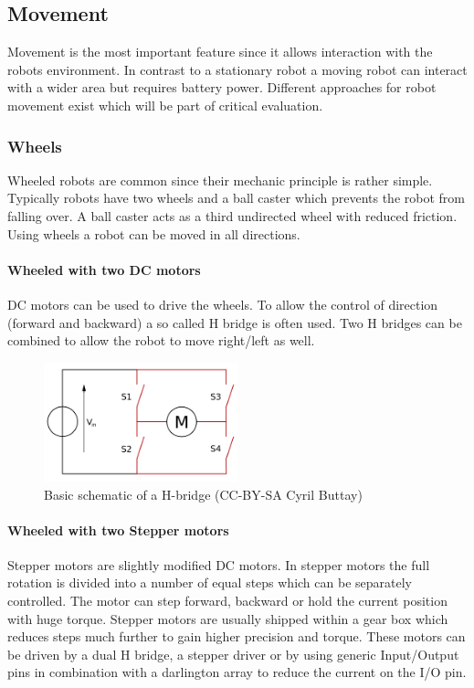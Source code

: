 \documentclass[twocolumn]{article}
\begin{document}
\subsection{Movement}
Movement is the most important feature since it allows interaction with the robots environment. In contrast to a stationary robot a moving robot can interact with a wider area but requires battery power. Different approaches for robot movement exist which will be part of critical evaluation.
\subsubsection{Wheels}
Wheeled robots are common since their mechanic principle is rather simple. Typically robots have two wheels and a ball caster which prevents the robot from falling over. A ball caster acts as a third undirected wheel with reduced friction. Using wheels a robot can be moved in all directions.
\paragraph{Wheeled with two DC motors}
DC motors can be used to drive the wheels. To allow the control of direction (forward and backward) a so called H bridge is often used. Two H bridges can be combined to allow the robot to move right/left as well. 
\begin{figure}[h!]
  \centering
  \includegraphics[width=0.5\textwidth]{images/hbridge.png}
  \caption{Basic schematic of a H-bridge (CC-BY-SA Cyril Buttay)}
\end{figure}
\paragraph{Wheeled with two Stepper motors}
Stepper motors are slightly modified DC motors. In stepper motors the full rotation is divided into a number of equal steps which can be separately controlled. The motor can step forward, backward or hold the current position with huge torque. Stepper motors are usually shipped within a gear box which reduces steps much further to gain higher precision and torque. 
These motors can be driven by a dual H bridge, a stepper driver or by using generic Input/Output pins in combination with a darlington array to reduce the current on the I/O pin. 
\end{document}
